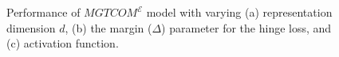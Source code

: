 \begin{figure}[ht!]
\centering
{}\quad
{}\quad
{}\quad
\caption{
Performance of $MGTCOM^{\mathcal{E}}$ model with varying (a) representation dimension $d$, (b) the margin ($\Delta$) parameter for the hinge loss, and (c) activation function.
}
\label{fig:hyp_rw_repr}
\end{figure}    